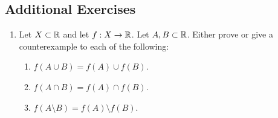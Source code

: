 \documentclass[../main.tex]{subfiles}
\begin{document}
\subsection*{Additional Exercises}
\begin{enumerate}[ref={\thechapter.\arabic*}]
    \item \label{axr:9.2}Let $X\subset\mathbb{R}$ and let $f:X\to\mathbb{R}$. Let $A,B\subset\mathbb{R}$. Either prove or give a counterexample to each of the following:
    \begin{enumerate}[label={\alph*)},ref={\theenumi\alph*}]
        \item \label{axr:9.2a}$f(A\cup B)=f(A)\cup f(B)$.
        \item \label{axr:9.2b}$f(A\cap B)=f(A)\cap f(B)$.
        \item \label{axr:9.2c}$f(A\setminus B)=f(A)\setminus f(B)$.
    \end{enumerate}
\end{enumerate}
\end{document}
